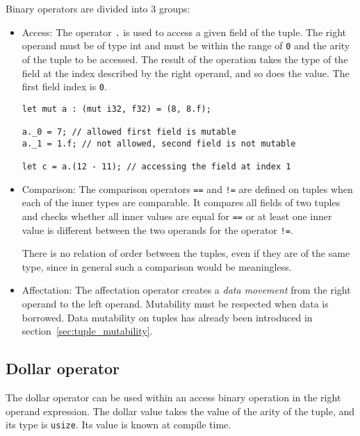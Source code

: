 Binary operators are divided into 3 groups:
\begin{itemize}
\item Access: The operator \texttt{.} is used to access a given field of the
  tuple. The right operand must be of type int and must be within the range of
  \texttt{0} and the arity of the tuple to be accessed. The result of the
  operation takes the type of the field at the index described by the right
  operand, and so does the value. The first field index is \texttt{0}.

  \begin{lstlisting}[style=coloredverbatim, linewidth=0.95\linewidth]
let mut a : (mut i32, f32) = (8, 8.f);

a._0 = 7; // allowed first field is mutable
a._1 = 1.f; // not allowed, second field is not mutable

let c = a.(12 - 11); // accessing the field at index 1
  \end{lstlisting}

\item Comparison: The comparison operators \texttt{==} and \texttt{!=} are
  defined on tuples when each of the inner types are comparable. It compares all
  fields of two tuples and checks whether all inner values are equal for
  \texttt{==} or at least one inner value is different between the two operands
  for the operator \texttt{!=}.

  There is no relation of order between the tuples, even if they are of the same
  type, since in general such a comparison would be meaningless.

\item Affectation: The affectation operator creates a \textit{data movement}
  from the right operand to the left operand. Mutability must be respected when
  data is borrowed. Data mutability on tuples has already been introduced in
  section~\ref{sec:tuple_mutability}.

\end{itemize}

\subsection {Dollar operator}

The dollar operator can be used within an access binary operation in the right
operand expression. The dollar value takes the value of the arity of the tuple,
and its type is \texttt{usize}. Its value is known at compile time.

